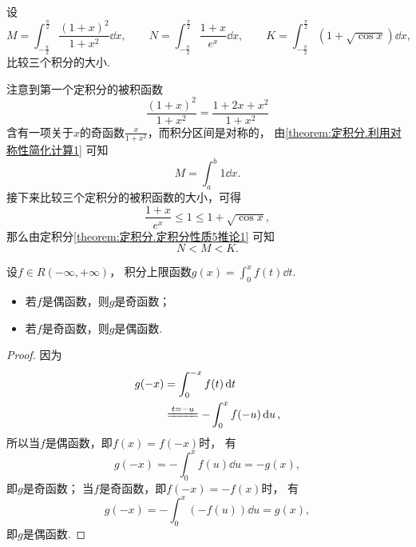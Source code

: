 \begin{example}
设\[
	M = \int_{-\frac\pi2}^{\frac\pi2} \frac{(1+x)^2}{1+x^2} \dd{x},
	\qquad
	N = \int_{-\frac\pi2}^{\frac\pi2} \frac{1+x}{e^x} \dd{x},
	\qquad
	K = \int_{-\frac\pi2}^{\frac\pi2} (1+\sqrt{\cos x}) \dd{x},
\]
比较三个积分的大小.
\begin{solution}
注意到第一个定积分的被积函数\[
	\frac{(1+x)^2}{1+x^2}
	= \frac{1+2x+x^2}{1+x^2}
\]含有一项关于\(x\)的奇函数\(\frac{x}{1+x^2}\)，而积分区间是对称的，
由\cref{theorem:定积分.利用对称性简化计算1} 可知\[
	M = \int_a^b 1 \dd{x}.
\]
接下来比较三个定积分的被积函数的大小，可得\[
	\frac{1+x}{e^x} \leq 1 \leq 1 + \sqrt{\cos x},
\]
那么由定积分\cref{theorem:定积分.定积分性质5推论1} 可知\[
	N < M < K.
\]
\end{solution}
\end{example}

\begin{corollary}\label{theorem:定积分.积分上限函数的奇偶性}
设\(f \in R(-\infty,+\infty)\)，
积分上限函数\(g(x) = \int_0^x f(t) \dd{t}\).
\begin{itemize}
	\item 若\(f\)是偶函数，则\(g\)是奇函数；
	\item 若\(f\)是奇函数，则\(g\)是偶函数.
\end{itemize}
\begin{proof}
因为\begin{align*}
	g(-x) &= \int_0^{-x} f(t) \dd{t} \\
	&\xlongequal{t=-u}
	-\int_0^x f(-u) \dd{u},
\end{align*}
所以当\(f\)是偶函数，即\(f(x) = f(-x)\)时，
有\begin{equation*}
	g(-x) = -\int_0^x f(u) \dd{u} = -g(x),
\end{equation*}
即\(g\)是奇函数；
当\(f\)是奇函数，即\(f(-x) = -f(x)\)时，
有\begin{equation*}
	g(-x) = -\int_0^x (-f(u)) \dd{u} = g(x),
\end{equation*}
即\(g\)是偶函数.
\end{proof}
\end{corollary}

